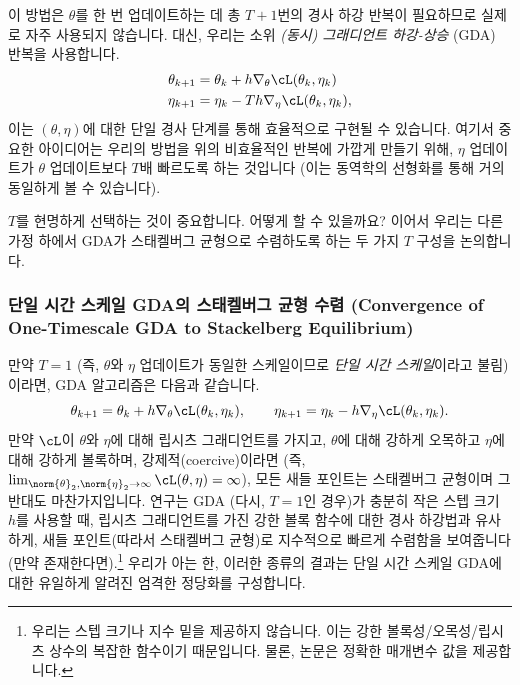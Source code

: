 \documentclass[../../book-main_ko.tex]{subfiles}
\begin{document}
이 방법은 \(\theta\)를 한 번 업데이트하는 데 총 \(T + 1\)번의 경사 하강 반복이 필요하므로 실제로 자주 사용되지 않습니다. 대신, 우리는 소위 \textit{(동시) 그래디언트 하강-상승} (GDA) 반복을 사용합니다.
\begin{align}
    \theta_{k + 1}
    &= \theta_{k} + h\nabla_{\theta}\cL(\theta_{k}, \eta_{k}) \\
    \eta_{k + 1}
    &= \eta_{k} - Th\nabla_{\eta}\cL(\theta_{k}, \eta_{k}),
\end{align}
이는 \((\theta, \eta)\)에 대한 단일 경사 단계를 통해 효율적으로 구현될 수 있습니다. 여기서 중요한 아이디어는 우리의 방법을 위의 비효율적인 반복에 가깝게 만들기 위해, \(\eta\) 업데이트가 \(\theta\) 업데이트보다 \(T\)배 빠르도록 하는 것입니다 (이는 동역학의 선형화를 통해 거의 동일하게 볼 수 있습니다).

\(T\)를 현명하게 선택하는 것이 중요합니다. 어떻게 할 수 있을까요? 이어서 우리는 다른 가정 하에서 GDA가 스태켈버그 균형으로 수렴하도록 하는 두 가지 \(T\) 구성을 논의합니다.

\subsubsection{단일 시간 스케일 GDA의 스태켈버그 균형 수렴 (Convergence of One-Timescale GDA to Stackelberg Equilibrium)}

만약 \(T = 1\) (즉, \(\theta\)와 \(\eta\) 업데이트가 동일한 스케일이므로 \textit{단일 시간 스케일}이라고 불림)이라면, GDA 알고리즘은 다음과 같습니다.
\begin{equation}
    \theta_{k + 1} = \theta_{k} + h\nabla_{\theta}\cL(\theta_{k}, \eta_{k}), \qquad \eta_{k + 1} = \eta_{k} - h\nabla_{\eta}\cL(\theta_{k}, \eta_{k}).
\end{equation}
만약 \(\cL\)이 \(\theta\)와 \(\eta\)에 대해 립시츠 그래디언트를 가지고, \(\theta\)에 대해 강하게 오목하고 \(\eta\)에 대해 강하게 볼록하며, 강제적(coercive)이라면 (즉, \(\lim_{\norm{\theta}_{2}, \norm{\eta}_{2} \to \infty}\cL(\theta, \eta) = \infty\)), 모든 새들 포인트는 스태켈버그 균형이며 그 반대도 마찬가지입니다. \cite{zamani2024convergence} 연구는 GDA (다시, \(T = 1\)인 경우)가 충분히 작은 스텝 크기 \(h\)를 사용할 때, 립시츠 그래디언트를 가진 강한 볼록 함수에 대한 경사 하강법과 유사하게, 새들 포인트(따라서 스태켈버그 균형)로 지수적으로 빠르게 수렴함을 보여줍니다 (만약 존재한다면).\footnote{우리는 스텝 크기나 지수 밑을 제공하지 않습니다. 이는 강한 볼록성/오목성/립시츠 상수의 복잡한 함수이기 때문입니다. 물론, \cite{zamani2024convergence} 논문은 정확한 매개변수 값을 제공합니다.} 우리가 아는 한, 이러한 종류의 결과는 단일 시간 스케일 GDA에 대한 유일하게 알려진 엄격한 정당화를 구성합니다.
\end{document}

